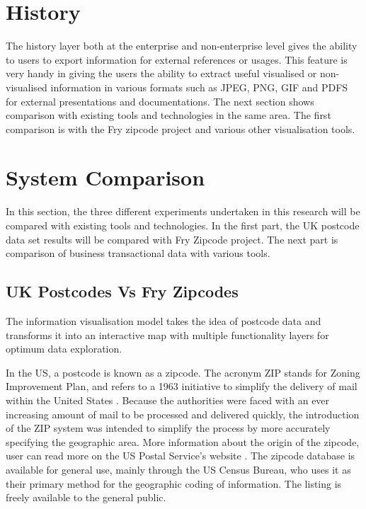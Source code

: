 \section{History}

The history layer both at the enterprise and non-enterprise level gives the ability to users to export information for external references or usages. This feature is very handy in giving the users the ability to extract useful visualised or non-visualised information in various formats such as JPEG, PNG, GIF and PDFS for external presentations and documentations. The next section shows comparison with existing tools and technologies in the same area. The first comparison is with the Fry \cite{fry} zipcode project and various other visualisation tools.

\section{System Comparison}

In this section, the three different experiments undertaken in this research will be compared with existing tools and technologies. In the first part, the UK postcode data set results will be compared with Fry \cite{fry} Zipcode project. The next part is comparison of business transactional data with various tools.

\subsection{UK Postcodes Vs Fry Zipcodes}

The information visualisation model takes the idea of postcode data and transforms it into an interactive map with multiple functionality layers for optimum data exploration. 

In the US, a postcode is known as a zipcode. The acronym ZIP stands for Zoning Improvement Plan, and refers to a 1963 initiative to simplify the delivery of mail within the United States \cite{mccurley2001geospatial}. Because the authorities were faced with an ever increasing amount of mail to be processed and delivered quickly, the introduction of the ZIP system was intended to simplify the process by more accurately specifying the geographic area. More information about the origin of the zipcode, user can read more on the US Postal Service's website \cite{uszipcode}. The zipcode database is available for general use, mainly through the US Census Bureau, who uses it as their primary method for the geographic coding of information. The listing is freely available to the general public.


